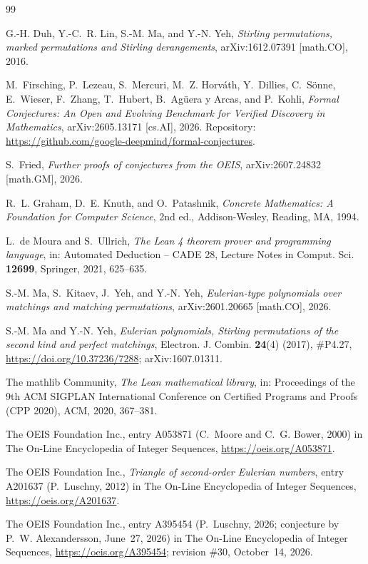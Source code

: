 \documentclass[11pt]{amsart}
\theoremstyle{plain}
\theoremstyle{definition}
\begin{document}
{\footnotesize
\begin{thebibliography}{99}

G.-H. Duh, Y.-C.~R. Lin, S.-M. Ma, and Y.-N. Yeh, \emph{Stirling permutations, marked permutations and Stirling derangements}, arXiv:1612.07391 [math.CO], 2016.

M.~Firsching, P.~Lezeau, S.~Mercuri, M.~Z. Horv\'ath, Y.~Dillies, C.~S\"onne, E.~Wieser, F.~Zhang, T.~Hubert, B.~Ag\"uera y Arcas, and P.~Kohli, \emph{Formal Conjectures: An Open and Evolving Benchmark for Verified Discovery in Mathematics}, arXiv:2605.13171 [cs.AI], 2026. Repository: \url{https://github.com/google-deepmind/formal-conjectures}.

S.~Fried, \emph{Further proofs of conjectures from the OEIS}, arXiv:2607.24832 [math.GM], 2026.

R.~L. Graham, D.~E. Knuth, and O.~Patashnik, \emph{Concrete Mathematics: A Foundation for Computer Science}, 2nd ed., Addison-Wesley, Reading, MA, 1994.

L.~de Moura and S.~Ullrich, \emph{The Lean 4 theorem prover and programming language}, in: Automated Deduction -- CADE 28, Lecture Notes in Comput. Sci. \textbf{12699}, Springer, 2021, 625--635.

S.-M. Ma, S.~Kitaev, J.~Yeh, and Y.-N. Yeh, \emph{Eulerian-type polynomials over matchings and matching permutations}, arXiv:2601.20665 [math.CO], 2026.

S.-M. Ma and Y.-N. Yeh, \emph{Eulerian polynomials, Stirling permutations of the second kind and perfect matchings}, Electron. J. Combin. \textbf{24}(4) (2017), \#P4.27, \url{https://doi.org/10.37236/7288}; arXiv:1607.01311.

The mathlib Community, \emph{The Lean mathematical library}, in: Proceedings of the 9th ACM SIGPLAN International Conference on Certified Programs and Proofs (CPP 2020), ACM, 2020, 367--381.

The OEIS Foundation Inc., entry A053871 (C.~Moore and C.~G. Bower, 2000) in The On-Line Encyclopedia of Integer Sequences, \url{https://oeis.org/A053871}.

The OEIS Foundation Inc., \emph{Triangle of second-order Eulerian numbers}, entry A201637 (P.~Luschny, 2012) in The On-Line Encyclopedia of Integer Sequences, \url{https://oeis.org/A201637}.

The OEIS Foundation Inc., entry A395454 (P.~Luschny, 2026; conjecture by P.~W. Alexandersson, June~27, 2026) in The On-Line Encyclopedia of Integer Sequences, \url{https://oeis.org/A395454}; revision \#30, October~14, 2026.

\end{thebibliography}
}
\end{document}
